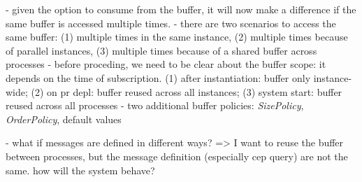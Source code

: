- given the option to consume from the buffer, it will now make a difference if the same buffer is accessed multiple times.
- there are two scenarios to access the same buffer: (1) multiple times in the same instance, (2) multiple times because of parallel instances, (3) multiple times because of a shared buffer across processes
- before proceding, we need to be clear about the buffer scope: it depends on the time of subscription. (1) after instantiation: buffer only instance-wide; (2) on pr depl: buffer reused across all instances; (3) system start: buffer reused across all processes
- two additional buffer policies: \textit{SizePolicy}, \textit{OrderPolicy}, default values


- what if messages are defined in different ways? => I want to reuse the buffer between processes, but the message definition (especially cep query) are not the same. how will the system behave?
